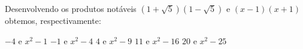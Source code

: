 Desenvolvendo os produtos notáveis $(1+\sqrt{5})(1-\sqrt{5})$ e $(x-1)(x+1)$ obtemos, respectivamente:

$-4$ e $x^2-1$
$-1$ e $x^2-4$
$4$ e $x^2-9$
$11$ e $x^2-16$
$20$ e $x^2-25$


